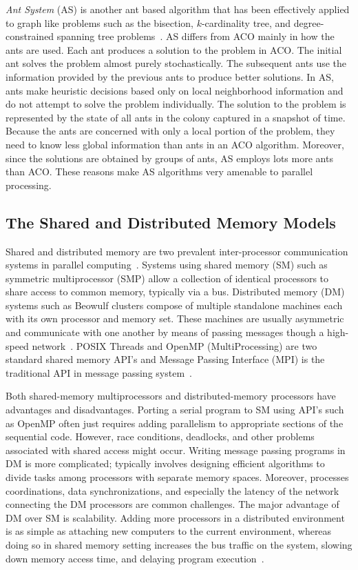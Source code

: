 \documentclass[11pt]{article}
\begin{document}
\textit{Ant System} (AS) is another ant based algorithm that has been effectively applied to graph like problems such as the bisection, $k$-cardinality tree, and degree-constrained spanning tree problems~\cite{BS2, BS1, BZ}.  AS differs from ACO mainly in how the ants are used. Each ant produces a solution to the problem in ACO. The initial ant solves the problem almost purely stochastically. The subsequent ants use the information provided by the previous ants to produce better solutions. In AS, ants make heuristic decisions based only on local neighborhood information and do not attempt to solve the problem individually. The solution to the problem is represented by the state of all ants in the colony captured in a snapshot of time. Because the ants are concerned with only a local portion of the problem, they need to know less global information than ants in an ACO algorithm. Moreover, since the solutions are obtained by groups of ants, AS employs lots more ants than ACO. These reasons make AS algorithms very amenable to parallel processing. 


\subsection{The Shared and Distributed Memory Models}


Shared and distributed memory are two prevalent inter-processor communication systems in parallel computing~\cite{PH}. Systems using shared memory (SM) such as symmetric multiprocessor (SMP) allow a collection of identical processors to share access to common memory, typically via a bus.  Distributed memory (DM) systems such as Beowulf clusters compose of multiple standalone machines each with its own processor and memory set. These machines are usually asymmetric and communicate with one another by means of passing messages though a high-speed network~\cite{cluster}.  POSIX Threads and OpenMP (MultiProcessing) are two standard shared memory API's and Message Passing Interface (MPI) is the traditional API in message passing system~\cite{MPI,OpenMP}.


Both shared-memory multiprocessors and distributed-memory processors have advantages and disadvantages. Porting a serial program to SM using API's such as OpenMP often just requires adding parallelism to appropriate sections of the sequential code.  However, race conditions, deadlocks, and other problems associated with shared access might occur.  Writing message passing programs in DM is more complicated; typically involves designing efficient algorithms to divide tasks among processors with separate memory spaces.  Moreover, processes coordinations, data synchronizations, and especially the latency of the network connecting the DM processors are common challenges.  The major advantage of DM over SM is scalability.  Adding more processors in a distributed environment is as simple as attaching new computers to the current environment, whereas doing so in shared memory setting increases the bus traffic on the system, slowing down memory access time, and delaying program execution~\cite{}.
\end{document}
